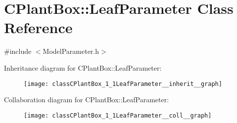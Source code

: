 \hypertarget{classCPlantBox_1_1LeafParameter}{}\section{C\+Plant\+Box\+:\+:Leaf\+Parameter Class Reference}
\label{classCPlantBox_1_1LeafParameter}


{\ttfamily \#include $<$Model\+Parameter.\+h$>$}



Inheritance diagram for C\+Plant\+Box\+:\+:Leaf\+Parameter\+:\nopagebreak
\begin{figure}[H]
\begin{center}
\leavevmode
\texttt{[image: classCPlantBox\_1\_1LeafParameter\_\_inherit\_\_graph]}
\end{center}
\end{figure}


Collaboration diagram for C\+Plant\+Box\+:\+:Leaf\+Parameter\+:\nopagebreak
\begin{figure}[H]
\begin{center}
\leavevmode
\texttt{[image: classCPlantBox\_1\_1LeafParameter\_\_coll\_\_graph]}
\end{center}
\end{figure}
